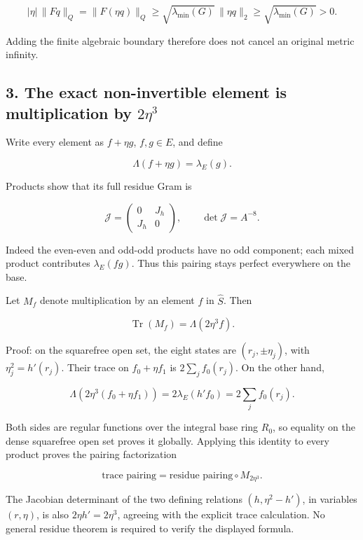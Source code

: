 \[
 \boxed{|\eta|\,\|Fq\|_Q=\|F(\eta q)\|_Q
 \ge \sqrt{\lambda_{\min}(G)}\,\|\eta q\|_2
 \ge \sqrt{\lambda_{\min}(G)}>0.}
\]

Adding the finite algebraic boundary therefore does not cancel an
original metric infinity.

\subsection{\texorpdfstring{3. The exact non-invertible element is
multiplication by
\(2\eta^3\)}{3. The exact non-invertible element is multiplication by 2\textbackslash eta\^{}3}}\label{the-exact-non-invertible-element-is-multiplication-by-2eta3}

Write every element as \(f+\eta g\), \(f,g\in E\), and define

\[
 \Lambda(f+\eta g)=\lambda_E(g).
\]

Products show that its full residue Gram is

\[
 \mathcal J=\begin{pmatrix}0&J_h\\J_h&0\end{pmatrix},
 \qquad \boxed{\det\mathcal J=A^{-8}.}
\]

Indeed the even-even and odd-odd products have no odd component; each
mixed product contributes \(\lambda_E(fg)\). Thus this pairing stays
perfect everywhere on the base.

Let \(M_f\) denote multiplication by an element \(f\) in \(\widehat S\).
Then

\[
 \boxed{\operatorname{Tr}(M_f)=\Lambda(2\eta^3 f).}
\]

Proof: on the squarefree open set, the eight states are
\((r_j,\pm\eta_j)\), with \(\eta_j^2=h'(r_j)\). Their trace on
\(f_0+\eta f_1\) is \(2\sum_j f_0(r_j)\). On the other hand,

\[
 \Lambda(2\eta^3(f_0+\eta f_1))
 =2\lambda_E(h'f_0)=2\sum_j f_0(r_j).
\]

Both sides are regular functions over the integral base ring \(R_0\), so
equality on the dense squarefree open set proves it globally. Applying
this identity to every product proves the pairing factorization

\[
 \boxed{\text{trace pairing}=\text{residue pairing}\circ M_{2\eta^3}.}
\]

The Jacobian determinant of the two defining relations
\((h,\eta^2-h')\), in variables \((r,\eta)\), is also
\(2\eta h'=2\eta^3\), agreeing with the explicit trace calculation. No
general residue theorem is required to verify the displayed formula.

